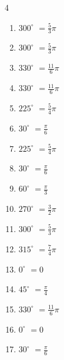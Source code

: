 \begin{multicols}{4}
\begin{enumerate}
  \item $\displaystyle 300^{\circ}$
        $\displaystyle =\frac{5}{3}\pi$

\columnbreak %

\resetques

  \item $\displaystyle 300^{\circ}$
        $\displaystyle =\frac{5}{3}\pi$

  \item $\displaystyle 330^{\circ}$
        $\displaystyle =\frac{11}{6}\pi$

  \item $\displaystyle 330^{\circ}$
        $\displaystyle =\frac{11}{6}\pi$

  \item $\displaystyle 225^{\circ}$
        $\displaystyle =\frac{5}{4}\pi$

  \item $\displaystyle 30^{\circ}$
        $\displaystyle =\frac{\pi}{6}$

  \item $\displaystyle 225^{\circ}$
        $\displaystyle =\frac{5}{4}\pi$

  \item $\displaystyle 30^{\circ}$
        $\displaystyle =\frac{\pi}{6}$

  \item $\displaystyle 60^{\circ}$
        $\displaystyle =\frac{\pi}{3}$

  \item $\displaystyle 270^{\circ}$
        $\displaystyle =\frac{3}{2}\pi$

  \item $\displaystyle 300^{\circ}$
        $\displaystyle =\frac{5}{3}\pi$

  \item $\displaystyle 315^{\circ}$
        $\displaystyle =\frac{7}{4}\pi$

  \item $\displaystyle 0^{\circ}$
        $\displaystyle =0$

  \item $\displaystyle 45^{\circ}$
        $\displaystyle =\frac{\pi}{4}$

  \item $\displaystyle 330^{\circ}$
        $\displaystyle =\frac{11}{6}\pi$

  \item $\displaystyle 0^{\circ}$
        $\displaystyle =0$

  \item $\displaystyle 30^{\circ}$
        $\displaystyle =\frac{\pi}{6}$


\end{enumerate}
\end{multicols}
